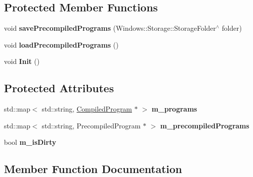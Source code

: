 \subsection*{Protected Member Functions}
\begin{DoxyCompactItemize}
\item 
\mbox{\label{classCCPrecompiledShaders_a93096610788de4acda709febc0b829dc}} 
void {\bfseries save\+Precompiled\+Programs} (Windows\+::\+Storage\+::\+Storage\+Folder$^\wedge$ folder)
\item 
\mbox{\label{classCCPrecompiledShaders_acff5ca8c869011b4e267bfccce2f2683}} 
void {\bfseries load\+Precompiled\+Programs} ()
\item 
\mbox{\label{classCCPrecompiledShaders_a281bae63d68878985dffb3456f58f5ee}} 
void {\bfseries Init} ()
\end{DoxyCompactItemize}
\subsection*{Protected Attributes}
\begin{DoxyCompactItemize}
\item 
\mbox{\label{classCCPrecompiledShaders_a999fc93e7dae00fc82cd39edc2f4ebed}} 
std\+::map$<$ std\+::string, \hyperlink{struct__CompiledProgram}{Compiled\+Program} $\ast$ $>$ {\bfseries m\+\_\+programs}
\item 
\mbox{\label{classCCPrecompiledShaders_ac616a49e68a81005cf35406b259b5821}} 
std\+::map$<$ std\+::string, Precompiled\+Program $\ast$ $>$ {\bfseries m\+\_\+precompiled\+Programs}
\item 
\mbox{\label{classCCPrecompiledShaders_a73973c5af8b17c1423251feeb7c9a424}} 
bool {\bfseries m\+\_\+is\+Dirty}
\end{DoxyCompactItemize}


\subsection{Member Function Documentation}
\mbox{\label{classCCPrecompiledShaders_a58b4d02e74636859e43b15772acad36e}} 
